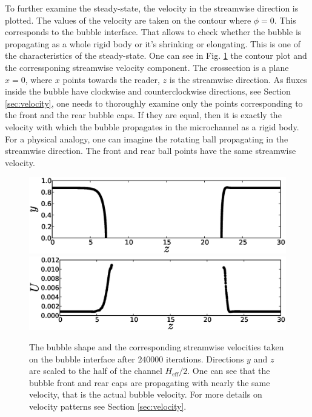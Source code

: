 \documentclass[preprint,12pt]{elsarticle}
\begin{document}
To further examine the steady-state, the velocity in the streamwise direction is plotted. The values
of the velocity are taken on the contour where $\phi=0$. This corresponds
 to the bubble interface. That allows to check whether the bubble is propagating as a whole rigid
body or it's shrinking or elongating. This is one of the characteristics of the steady-state.  One
can see in Fig. \ref{fig:velocity:contour} the contour plot and the
corressponing streamwise velocity
component. The crossection is a plane $x=0$, where $x$ points
towards the reader, $z$ is the streamwise direction. As fluxes inside the bubble have
clockwise and counterclockwise directions, see Section \ref{sec:velocity}, one needs to thoroughly
examine only the points corresponding to the front and the rear bubble caps. If they are equal, then
it is exactly the velocity with which the bubble propagates in the microchannel as a rigid body.
For a physical analogy, one can imagine the rotating ball propagating in the streamwise direction.
The front and rear ball points have the same streamwise velocity. 
\begin{figure}[ht]
\includegraphics[width=\textwidth]{velocity_interface_contour.eps}\\
\includegraphics[width=\textwidth]{velocity_interface_values.eps}\\
\caption{The bubble shape and the corresponding streamwise velocities taken on the bubble
interface after $240000$ iterations. Directions $y$ and $z$ are scaled to the half of the channel
$H_{\mathrm{eff}}/2$. One can see that the bubble front and rear caps are propagating with nearly
the
same velocity, that is the actual bubble velocity. For more details on velocity patterns
see Section \ref{sec:velocity}. \label{fig:velocity:contour}}
\end{figure}
\end{document}
